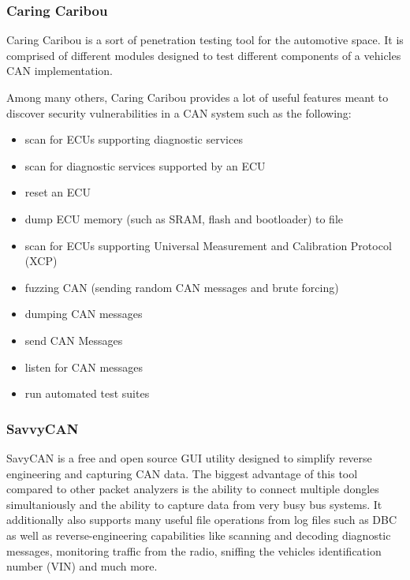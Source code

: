 

\subsubsection{Caring Caribou}
Caring Caribou is a sort of penetration testing tool for the automotive space. It is comprised of different modules designed to test different components of a vehicles CAN implementation.

Among many others, Caring Caribou provides a lot of useful features meant to discover security vulnerabilities in a CAN system such as the following:
\begin{itemize}
    \item scan for ECUs supporting diagnostic services
    \item scan for diagnostic services supported by an ECU
    \item reset an ECU
    \item dump ECU memory (such as SRAM, flash and bootloader) to file
    \item scan for ECUs supporting Universal Measurement and Calibration Protocol (XCP)
    \item fuzzing CAN (sending random CAN messages and brute forcing)
    \item dumping CAN messages
    \item send CAN Messages
    \item listen for CAN messages
    \item run automated test suites
\end{itemize}

\subsubsection{SavvyCAN}
SavyCAN is a free and open source GUI utility designed to simplify reverse engineering and capturing CAN data. The biggest advantage of this tool compared to other packet analyzers is the ability to connect multiple dongles simultaniously and the ability to capture data from very busy bus systems. It additionally also supports many useful file operations from log files such as DBC as well as reverse-engineering capabilities like scanning and decoding diagnostic messages, monitoring traffic from the radio, sniffing the vehicles identification number (VIN) and much more.

